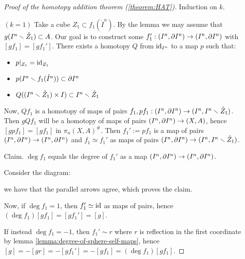 \begin{proof}[Proof of the homotopy addition theorem (\ref{theorem:HAT})]\renewcommand{\qedsymbol}{\textit{To be continued...}} Induction on $k$.

$(k=1)$ Take a cube $Z_1\subset f_1(\mathring{I}^n)$. By the lemma we may assume that $g(I^n\smallsetminus\mathring{Z}_1)\subset A$. Our goal is to construct some $f_1':(I^n,\partial I^n)\to(I^n,\partial I^n)$ with $[gf_1]=[gf_1']$. There exists\normalmarginpar{} a homotopy $Q$ from $\operatorname{id}_{I^n}$ to a map $p$ such that:
\begin{itemize}
    \item $p|_{Z_1}=\operatorname{id}_{Z_1}$
    \item $p(I^n\smallsetminus f_1(\mathring{I}^n))\subset\partial I^n$
    \item $Q((I^n\smallsetminus\mathring{Z}_1)\times I)\subset I^n\smallsetminus \mathring{Z}_1$
\end{itemize}
Now, $Qf_1$ is a homotopy of maps of pairs $f_1,pf_1: (I^n,\partial I^n)\to(I^n,I^n\smallsetminus\mathring{Z}_1)$. Then $gQf_1$ will be a homotopy of maps of pairs $(I^n,\partial I^n)\to(X,A)$, hence $[gpf_1]=[gf_1]$ in $\pi_n(X,A)^\#$. Then $f_1':= pf_1$ is a map of pairs $(I^n,\partial I^n)\to(I^n,\partial I^n)$ and $f_1\simeq f_1'$ as maps of pairs $(I^n,\partial I^n)\to(I^n,I^n\smallsetminus \mathring{Z}_1)$.

Claim.\reversemarginpar{} $\deg f_1$ equals the degree of $f_1'$ as a map $(I^n,\partial I^n)\to(I^n,\partial I^n)$.

\begin{claimproof}
Consider the diagram:
\begin{center}
\end{center}
we have that the parallel arrows agree, which proves the claim.
\end{claimproof}

Now, if $\deg f_1=1$, then $f_1'\simeq\operatorname{id}$ as maps of pairs, hence $(\deg f_1)[gf_1]=[gf_1']=[g]$.

If instead $\deg f_1=-1$, then $f_1'\sim r$ where $r$ is reflection in the first coordinate by lemma \ref{lemma:degree-of-sphere-self-maps}, hence $[g]=-[gr]=-[gf_1']=-[gf_1]=(\deg f_1)[gf_1]$.

\end{proof}
